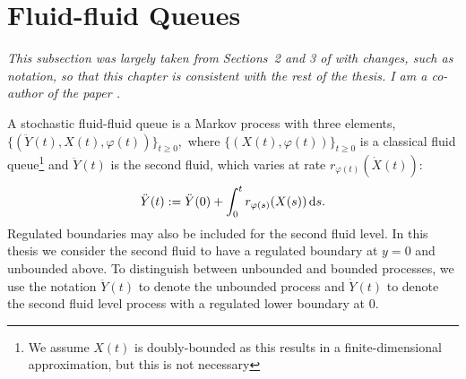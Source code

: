 
\section{Fluid-fluid Queues}\label{sec: ffq intro}
	\label{sec:prelim}
	\begin{center}
		\begin{minipage}{0.8\textwidth}
			\textit{This subsection was largely taken from Sections~2 and 3 of \cite{blnos2022} with changes, such as notation, so that this chapter is consistent with the rest of the thesis. I am a co-author of the paper \cite{blnos2022}. %
			}
		\end{minipage}
		\end{center}

A stochastic fluid-fluid queue \citep{bo2013} is a Markov process with three elements, $\{( \ddot{Y}(t),{X}(t), \varphi(t))\}_{t \geq 0},$ where $\{(X(t),\varphi(t))\}_{t\geq 0}$ is a classical fluid queue\footnote{We assume \(X(t)\) is doubly-bounded as this results in a finite-dimensional approximation, but this is not necessary} and $\ddot{Y}(t)$ is the second fluid, which varies at rate $r_{\varphi(t)}(\dot{X}(t))$:
% 
\begin{align*} 
	\ddot{Y}(t) := \ddot Y(0) + \int_0^t r_{\varphi(s)}({X}(s)) \, \mathrm{d} s.
\end{align*} 
% 
Regulated boundaries may also be included for the second fluid level. In this thesis we consider the second fluid to have a regulated boundary at \(y=0\) and unbounded above. To distinguish between unbounded and bounded processes, we use the notation \(\ddot Y(t)\) to denote the unbounded process and \(\dot Y(t)\) to denote the second fluid level process with a regulated lower boundary at 0.


